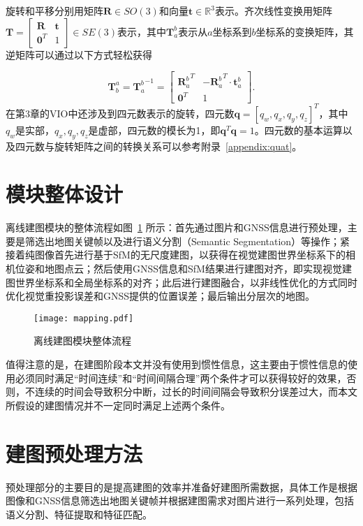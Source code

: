 旋转和平移分别用矩阵$\symbf{R} \in SO(3)$和向量$\symbf{t} \in \mathbb{R}^{3}$表示。齐次线性变换用矩阵$\symbf{T} = \begin{bmatrix} \symbf{R} & \symbf{t} \\ \symbf{0}^T & 1 \end{bmatrix} \in SE(3)$表示，其中$\symbf{T}_{a}^{b}$表示从$a$坐标系到$b$坐标系的变换矩阵，其逆矩阵可以通过以下方式轻松获得

\begin{equation}
  \symbf{T}^a_b = {\symbf{T}_a^b}^{-1} = \begin{bmatrix} {\symbf{R}_a^b}^T & -{\symbf{R}_a^b}^T\cdot\symbf{t}_a^b \\ \symbf{0}^T & 1 \end{bmatrix}.
\end{equation}
在第3章的VIO中还涉及到四元数表示的旋转，四元数$\symbf{q} = [q_w, q_x, q_y, q_z]^T$，其中$q_w$是实部，$q_x, q_y, q_z$是虚部，四元数的模长为1，即$\symbf{q}^T\symbf{q} = 1$。四元数的基本运算以及四元数与旋转矩阵之间的转换关系可以参考附录~\ref{appendix:quat}。

\section{模块整体设计}

离线建图模块的整体流程如图~\ref{fig:mapping} 所示：首先通过图片和GNSS信息进行预处理，主要是筛选出地图关键帧以及进行语义分割（Semantic Segmentation）等操作；紧接着纯图像首先进行基于SfM的无尺度建图，以获得在视觉建图世界坐标系下的相机位姿和地图点云；然后使用GNSS信息和SfM结果进行建图对齐，即实现视觉建图世界坐标系和全局坐标系的对齐；此后进行建图融合，以非线性优化的方式同时优化视觉重投影误差和GNSS提供的位置误差；最后输出分层次的地图。

\begin{figure}
  \centering
  \texttt{[image: mapping.pdf]}
  \caption{离线建图模块整体流程}
  \label{fig:mapping}
\end{figure}

值得注意的是，在建图阶段本文并没有使用到惯性信息，这主要由于惯性信息的使用必须同时满足“时间连续”和“时间间隔合理”两个条件才可以获得较好的效果，否则，不连续的时间会导致积分中断，过长的时间间隔会导致积分误差过大，而本文所假设的建图情况并不一定同时满足上述两个条件。

\section{建图预处理方法}
预处理部分的主要目的是提高建图的效率并准备好建图所需数据，具体工作是根据图像和GNSS信息筛选出地图关键帧并根据建图需求对图片进行一系列处理，包括语义分割、特征提取和特征匹配。

